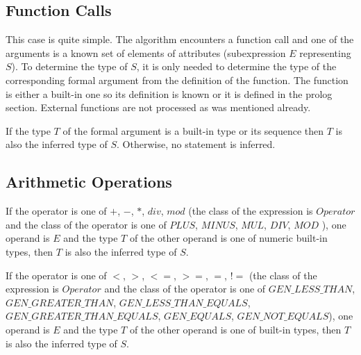 
\subsection{Function Calls}
This case is quite simple. The algorithm encounters a function call and one of the arguments is a known set of elements of attributes (subexpression $E$ representing $S$). To determine the type of $S$, it is only needed to determine the type of the corresponding formal argument from the definition of the function. The function is either a built-in one so its definition is known or it is defined in the prolog section. External functions are not processed as was mentioned already.

If the type $T$ of the formal argument is a built-in type or its sequence then $T$ is also the inferred type of $S$. Otherwise, no statement is inferred.

\subsection{Arithmetic Operations}
If the operator is one of $+$, $-$, $*$, $div$, $mod$ (the class of the expression is $Operator$ and the class of the operator is one of $PLUS$, $MINUS$, $MUL$, $DIV$, $MOD$ ), one operand is $E$ and the type $T$ of the other operand is one of numeric built-in types, then $T$ is also the inferred type of $S$.

If the operator is one of $<$, $>$, $<=$, $>=$, $=$, $!=$ (the class of the expression is $Operator$ and the class of the operator is one of $GEN\_LESS\_THAN$, $GEN\_GREATER\_THAN$, $GEN\_LESS\_THAN\_EQUALS$, $GEN\_GREATER\_THAN\_EQUALS$, $GEN\_EQUALS$, $GEN\_NOT\_EQUALS$), one operand is $E$ and the type $T$ of the other operand is one of built-in types, then $T$ is also the inferred type of $S$.